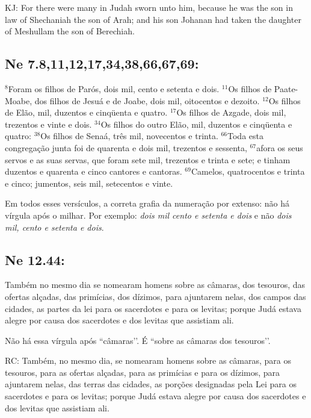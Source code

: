KJ: For there were many in Judah sworn unto him, because he was the son in law of Shechaniah the son of Arah; and his son Johanan had taken the daughter of Meshullam the son of Berechiah.

\subsection{Ne 7.8,11,12,17,34,38,66,67,69:}

$^{\mathrm{8}}$Foram os filhos de Parós, dois mil, cento e setenta e
dois. $^{\mathrm{11}}$Os filhos de Paate-Moabe, dos filhos de Jesuá e
de Joabe, dois mil, oitocentos e dezoito. $^{\mathrm{12}}$Os filhos de
Elão, mil, duzentos e cinqüenta e quatro. $^{\mathrm{17}}$Os filhos
de Azgade, dois mil, trezentos e vinte e dois. $^{\mathrm{34}}$Os
filhos do outro Elão, mil, duzentos e cinqüenta e quatro:
$^{\mathrm{38}}$Os filhos de Senaá, três mil, novecentos e trinta.
$^{\mathrm{66}}$Toda esta congregação junta foi de quarenta e dois
mil, trezentos e sessenta, $^{\mathrm{67}}$afora os seus servos e as
suas servas, que foram sete mil, trezentos e trinta e sete; e tinham
duzentos e quarenta e cinco cantores e cantoras.
$^{\mathrm{69}}$Camelos, quatrocentos e trinta e cinco; jumentos, seis
mil, setecentos e vinte.

Em todos esses versículos, a correta grafia da numeração por extenso:
não há vírgula após o milhar. Por exemplo: \emph{dois mil cento e
 setenta e dois} e não \emph{dois mil, cento e setenta e dois}.

\subsection{Ne 12.44:}

 Também no mesmo dia se nomearam homens sobre as câmaras\uline{,} dos tesouros, das ofertas alçadas, das primícias, dos dízimos, para ajuntarem nelas, dos campos das cidades, as partes da lei para os sacerdotes e para os levitas; porque Judá estava alegre por causa dos sacerdotes e dos levitas que assistiam ali.

Não há essa vírgula após ``câmaras’’. É ``sobre as câmaras dos tesouros’’.

RC: Também, no mesmo dia, se nomearam homens sobre as câmaras, para os tesouros, para as ofertas alçadas, para as primícias e para os dízimos, para ajuntarem nelas, das terras das cidades, as porções designadas pela Lei para os sacerdotes e para os levitas; porque Judá estava alegre por causa dos sacerdotes e dos levitas que assistiam ali.

